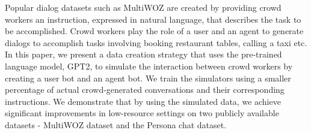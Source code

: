Popular dialog  datasets  such  as  MultiWOZ are created by providing crowd workers an instruction, expressed in  natural  language,  that  describes the task to be accomplished. Crowd workers play the role of a user and an agent to generate dialogs to accomplish tasks involving booking restaurant tables, calling a taxi etc.  In this paper,  we present  a  data  creation  strategy  that uses  the  pre-trained  language  model,  GPT2, to simulate the interaction between crowd workers by creating a user bot and an agent bot.  We train the simulators  using a  smaller percentage  of  actual  crowd-generated  conversations  and  their corresponding instructions.  We demonstrate that by using the simulated data,  we achieve significant improvements in low-resource settings on two publicly available datasets - MultiWOZ dataset and the Persona chat dataset.

